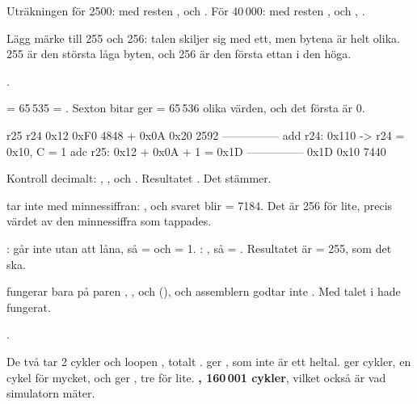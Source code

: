 \noindent Uträkningen för 2500:  med resten , och
. För 40\,000: \mbox{} med resten , och
, .

Lägg märke till 255 och 256: talen skiljer sig med ett, men bytena är helt olika. 255 är den
största låga byten, och 256 är den första ettan i den höga.

.

 = 65\,535 = . Sexton bitar ger  = 65\,536 olika
värden, och det första är 0.

\leavevmode

\begin{textdrawing}
                 r25    r24
                0x12   0xF0      4848
             +  0x0A   0x20      2592
             ---------------
  add r24:             0x110  -> r24 = 0x10, C = 1
  adc r25:     0x12 + 0x0A + 1 = 0x1D
             ---------------
                0x1D   0x10      7440
\end{textdrawing}

\noindent Kontroll decimalt: ,
, och . Resultatet
. Det stämmer.

 tar inte med minnessiffran: , och svaret blir
 = 7184. Det är 256 för lite, precis värdet av den minnessiffra som tappades.

:  går inte utan att låna, så  = 
och  = 1. : , så  =
. Resultatet är  = 255, som det ska.

 fungerar bara på paren , ,  och
 (), och assemblern godtar inte . Med talet i
 hade  fungerat.

\mbox{}.

De två  tar 2 cykler och loopen , totalt .
\mbox{} ger \mbox{}, som inte är ett heltal.
\mbox{} ger \mbox{} cykler, en cykel för mycket, och
\mbox{} ger \mbox{}, tre för lite. \textbf{\mbox{},
160\,001 cykler}, vilket också är vad simulatorn mäter.

